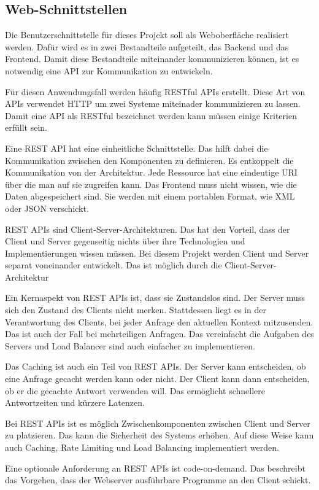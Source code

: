\subsection{Web-Schnittstellen}
Die Benutzerschnittstelle für dieses Projekt soll als Weboberfläche realisiert werden. Dafür wird es in zwei Bestandteile aufgeteilt, das Backend und das Frontend. Damit diese Bestandteile miteinander kommunizieren können, ist es notwendig eine \ac{API} zur Kommunikation zu entwickeln. 

Für diesen Anwendungsfall werden häufig \ac{REST}ful APIs erstellt. Diese Art von APIs verwendet HTTP um zwei Systeme miteinader kommunizieren zu lassen. Damit eine API als \ac{REST}ful bezeichnet werden kann müssen einige Kriterien erfüllt sein.
\cite{de_api_2017}

Eine REST API hat eine einheitliche Schnittstelle. Das hilft dabei die Kommunikation zwischen den Komponenten zu definieren. Es entkoppelt die Kommunikation von der Architektur. Jede Ressource hat eine eindeutige URI über die man auf sie zugreifen kann. Das Frontend muss nicht wissen, wie die Daten abgespeichert sind. Sie werden mit einem portablen Format, wie XML oder JSON verschickt.
\cite{de_api_2017}

REST APIs sind Client-Server-Architekturen. Das hat den Vorteil, dass der Client und Server gegenseitig nichts über ihre Technologien und Implementierungen wissen müssen. Bei diesem Projekt werden Client und Server separat voneinander entwickelt. Das ist möglich durch die Client-Server-Architektur
\cite{de_api_2017}

Ein Kernaspekt von REST APIs ist, dass sie Zustandslos sind. Der Server muss sich den Zustand des Clients nicht merken. Stattdessen liegt es in der Verantwortung des Clients, bei jeder Anfrage den aktuellen Kontext mitzusenden. Das ist auch der Fall bei mehrteiligen Anfragen. Das vereinfacht die Aufgaben des Servers und Load Balancer sind auch einfacher zu implementieren.
\cite{de_api_2017}

Das Caching ist auch ein Teil von REST APIs. Der Server kann entscheiden, ob eine Anfrage gecacht werden kann oder nicht. Der Client kann dann entscheiden, ob er die gecachte Antwort verwenden will. Das ermöglicht schnellere Antwortzeiten und kürzere Latenzen.
\cite{de_api_2017}

Bei REST APIs ist es möglich Zwischenkomponenten zwischen Client und Server zu platzieren. Das kann die Sicherheit des Systems erhöhen. Auf diese Weise kann auch Caching, Rate Limiting und Load Balancing implementiert werden.
\cite{de_api_2017}

Eine optionale Anforderung an REST APIs ist code-on-demand. Das beschreibt das Vorgehen, dass der Webserver ausführbare Programme an den Client schickt.
\cite{de_api_2017}
